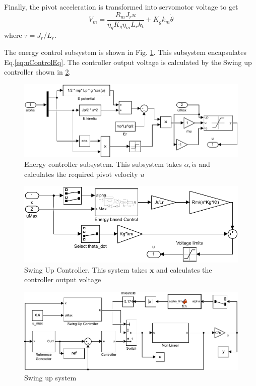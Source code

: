 \documentclass[superscriptaddress,floatfix,reprint,amssymb, amsmath,aps, pre]{revtex4-1}
\newcommand{\bx}{\textbf{x}}
\begin{document}
{{{            Finally, the pivot acceleration is transformed into servomotor voltage to get 
            \begin{equation}
                V_{m}=\frac{R_{m} J_r u}{\eta_{g} K_{g} \eta_{m} L_r k_{t}}+K_{g} k_{m} \dot{\theta}
            \end{equation}
            where \(\tau = J_r / L_r\). 
            
            The energy control subsystem is shown in Fig. \ref{fig:EnergyController}. This subsystem encapsulates Eq.\ref{eq:uControlEq}. The controller output voltage is calculated by the Swing up controller shown in \ref{fig:SwingUp}. 
            \begin{figure}
                \includegraphics[width = \linewidth]{EnergyControl.pdf}
                \caption{Energy controller subsystem. This subsystem takes \(\alpha, \dot \alpha\) and calculates the required pivot velocity \(u\)}
                \label{fig:EnergyController}
            \end{figure}
            \begin{figure}
                \includegraphics[width = \linewidth]{SwingUp.pdf}
                \caption{Swing Up Controller. This system takes \(\bx\) and calculates the controller output voltage}
                \label{fig:SwingUp}
            \end{figure}
            \begin{figure}
                \includegraphics[width = \linewidth]{SwingUpSystem.pdf}
                \caption{Swing up system}
                \label{fig:SwingUpSystem}
            \end{figure}
            
}}}
\end{document}
